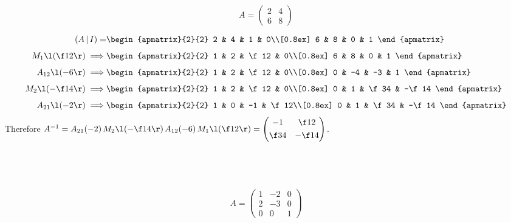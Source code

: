 \documentclass[a4paper]{article}
\begin{document}
\subsection{~} %

\begin{questionbody}
$$A = \begin{pmatrix}2 & 4\\ 6 & 8\end{pmatrix}$$
\end{questionbody}

\begin{align*}
(A\,|\,I) = &\begin{apmatrix}{2}{2}
	2 & 4 & 1 & 0\\[0.8ex]
	6 & 8 & 0 & 1
\end{apmatrix}\\[1ex]
M_1\l(\f12\r) \implies &\begin{apmatrix}{2}{2}
	1 & 2 & \f12 & 0\\[0.8ex]
	6 & 8 & 0 & 1
\end{apmatrix}\\[1ex]
A_{12} \l(-6\r) \implies &\begin{apmatrix}{2}{2}
	1 & 2 & \f12 & 0\\[0.8ex]
	0 & -4 & -3 & 1
\end{apmatrix}\\[1ex]
M_2 \l(-\f14\r) \implies &\begin{apmatrix}{2}{2}
	1 & 2 & \f12 & 0\\[0.8ex]
	0 & 1 & \f34 & -\f14
\end{apmatrix}\\[1ex]
A_{21} \l(-2\r) \implies &\begin{apmatrix}{2}{2}
	1 & 0 & -1 & \f12\\[0.8ex]
	0 & 1 & \f34 & -\f14
\end{apmatrix}
\end{align*}
Therefore $A^{-1} = A_{21}(-2)\, M_2\l(-\f14\r)\, A_{12}(-6)\, M_1\l(\f12\r) = \begin{pmatrix}-1 & \f12\\[0.8ex] \f34 & -\f14\end{pmatrix}$.

\subsection{~} %

\begin{questionbody}
$$A = \begin{pmatrix}
1 & -2 & 0\\
2 & -3 & 0\\
0 & 0 & 1
\end{pmatrix}$$
\end{questionbody}
\end{document}
